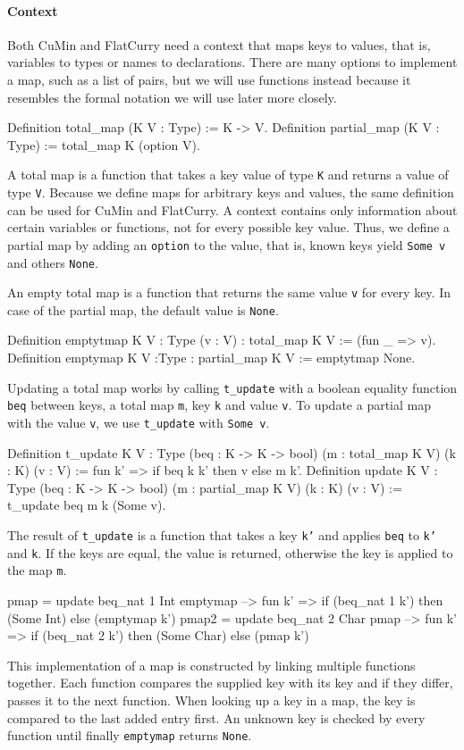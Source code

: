 \documentclass[paper = a4, fleqn, twoside]{scrreprt}
\begin{document}
\paragraph{Context}
Both CuMin and FlatCurry need a context that maps keys to values, that is, variables to types or names to declarations. There are many options to implement a map, such as a list of pairs, but we will use functions instead because it resembles the formal notation we will use later more closely.
\begin{coqcode}
Definition total_map   (K V : Type) := K -> V.
Definition partial_map (K V : Type) := total_map K (option V).
\end{coqcode}
A total map is a function that takes a key value of type \texttt{K} and returns a value of type \texttt{V}. Because we define maps for arbitrary keys and values, the same definition can be used for CuMin and FlatCurry. A context contains only information about certain variables or functions, not for every possible key value. Thus, we define a partial map by adding an \texttt{option} to the value, that is, known keys yield \texttt{Some v} and others \texttt{None}.\\
\par \noindent
An empty total map is a function that returns the same value \texttt{v}  for every key. In case of the partial map, the default value is \texttt{None}.
\begin{coqcode}
Definition emptytmap {K V : Type} (v : V) : total_map K V := (fun _ => v).
Definition emptymap {K V :Type} : partial_map K V := emptytmap None.
\end{coqcode}
Updating a total map works by calling \texttt{t\_update} with a boolean equality function \texttt{beq} between keys, a total map \texttt{m}, key \texttt{k} and value \texttt{v}. To update a partial map with the value \texttt{v}, we use \texttt{t\_update} with \texttt{Some v}.
\begin{coqcode}
Definition t_update {K V : Type} (beq : K -> K -> bool) (m : total_map K V)
(k : K) (v : V) := fun k' => if beq k k' then v else m k'.
Definition update {K V : Type} (beq : K -> K -> bool) (m : partial_map K V)
(k : K) (v : V) := t_update beq m k (Some v).
\end{coqcode}
The result of \texttt{t\_update} is a function that takes a key \texttt{k'} and applies \texttt{beq} to \texttt{k'} and \texttt{k}. If the keys are equal, the value is returned, otherwise the key is applied to the map \texttt{m}. 
\begin{coqcode}
pmap = update beq_nat 1 Int emptymap
--> fun k' => if (beq_nat 1 k') then (Some Int) else (emptymap k')
pmap2 = update beq_nat 2 Char pmap
--> fun k' => if (beq_nat 2 k') then (Some Char) else (pmap k')   
\end{coqcode}
This implementation of a map is constructed by linking multiple functions together. Each function compares the supplied key with its key and if they differ, passes it to the next function. When looking up a key in a map, the key is compared to the last added entry first. An unknown key is checked by every function until finally \texttt{emptymap} returns \texttt{None}.
\end{document}
